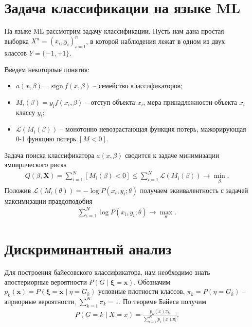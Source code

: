 \documentclass{article}
\DeclareMathOperator*{\argmax}{arg\,max}
\begin{document}

\section{Задача классификации на языке ML}\label{sec:MLClassification}
На языке ML рассмотрим задачу классификации. Пусть нам дана простая выборка $X^n = (x_i, y_i)_{i = 1}^n$, в которой наблюдения лежат в одном из двух классов $Y = \{-1, +1\}$.

Введем некотороые понятия:
\begin{itemize}
  \item $a(x, \beta) = \mathrm{sign}~f(x, \beta)$ -- семейство классификаторов;
  \item $M_i(\beta) = y_i f(x_i, \beta)$ -- отступ объекта $x_i$, мера принадлежности объекта $x_i$ классу $y_i$;
  \item $\mathcal{L}(M_i(\beta))$ -- монотонно невозрастающая функция потерь, мажорирующая 0-1 функцию потерь $[M < 0]$.
\end{itemize}
\bigskip
Задача поиска классификатора $a(x, \beta)$ сводится к задаче минимизации эмпирического риска
\begin{align*}
  Q(\beta, \mathbf{X}) = \sum_{i = 1}^N [M_i(\beta) < 0] \leq \sum_{i = 1}^N \mathcal{L}(M_i(\beta)) \rightarrow \min_\beta.
\end{align*}
Положив $\mathcal{L}(M_i(\theta)) = -\log P(x_i, y_i; \theta)$ получаем эквивалентность с задачей максимизации правдоподобия
\begin{align*}
  \sum_{i = 1}^N \log P(x_i, y_i; \theta) \rightarrow \max_\theta.
\end{align*}

\section{Дискриминантный анализ}

Для построения байесовского классификатора, нам необходимо знать апостериорные вероятности $P(G \mid \boldsymbol{\xi} = \mathbf{x})$. Обозначим $p_k(\mathbf{x}) = P(\boldsymbol{\xi} = \mathbf{x} \mid \eta = G_k)$ условные плотности классов, $\pi_k = P(\eta = G_k)$ -- априорные вероятности, $\sum_{k = 1}^{K} \pi_k = 1$. По теореме Байеса получим
\begin{align*}
   P(G = k \mid X = x) = \frac{p_k(x) \pi_k}{\sum_{i = 1}^K p_i(x)\pi_l}.
\end{align*}
\end{document}

